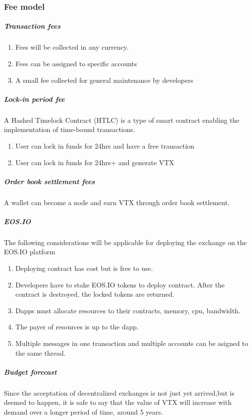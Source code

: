 \documentclass[]{article}
\begin{document}
\subsubsection{Fee model}
\subparagraph{Transaction fees\\}
\begin{enumerate}
	\item Fees will be collected in any currency.\\
	\item Fees can be assigned to specific accounts\\
	\item A small fee collected for general maintenance by developers\\
\end{enumerate}
\subparagraph{Lock-in period fee\\}
	A Hashed Timelock Contract (HTLC)\cite{22} is a type of smart contract enabling the implementation of time-bound transactions.
\begin{enumerate}
	\item User can lock in funds for 24hrs and have a free transaction\\
	\item User can lock in funds for 24hrs+ and generate VTX \\
\end{enumerate}
\subparagraph{Order book settlement fees}
A wallet can become a node and earn VTX through order book settlement. 


\subparagraph{EOS.IO}
The following considerations will be applicable for deploying the exchange on the EOS.IO platform
\begin{enumerate}
\item Deploying contract has cost but is free to use. 
\item Developers have to stake EOS.IO tokens to deploy contract.
After the contract is destroyed, the locked tokens are returned.
\item Dapps must allocate resources to their contracts, memory, cpu, bandwidth. 
\item The payer of resources is up to the dapp.
\item Multiple messages in one transaction and multiple accounts can be asigned to the same thread.

\end{enumerate}

\subparagraph{Budget forecast}
Since the acceptation of decentralized exchanges is not just yet arrived,but is deemed to happen, 
it is safe to say that the value of VTX will increase with demand over a longer period of time, around 5 years.
\end{document}
